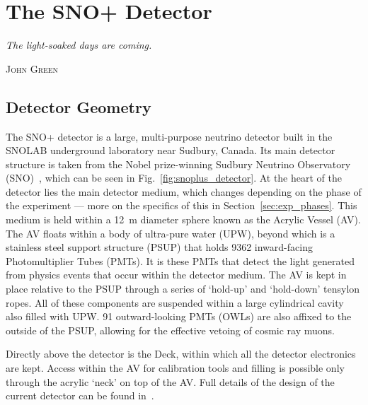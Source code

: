 
\chapter{The SNO+ Detector}\label{chap:detector}
\epigraph{\textit{The light-soaked days are coming.}}{\textsc{John Green}}
\section{Detector Geometry}
The SNO+ detector is a large, multi-purpose neutrino detector built in the SNOLAB underground laboratory near Sudbury, Canada. Its main detector structure is taken from the Nobel prize-winning Sudbury Neutrino Observatory (SNO)~\cite{}, %
which can be seen in Fig.~\ref{fig:snoplus_detector}. At the heart of the detector lies the main detector medium, which changes depending on the phase of the experiment --- more on the specifics of this in Section~\ref{sec:exp_phases}. This medium is held within a \SI{12}{\metre} diameter sphere known as the Acrylic Vessel (AV). The AV floats within a body of ultra-pure water (UPW), beyond which is a stainless steel support structure (PSUP) that holds 9362 inward-facing Photomultiplier Tubes (PMTs). It is these PMTs that detect the light generated from physics events that occur within the detector medium. The AV is kept in place relative to the PSUP through a series of `hold-up' and `hold-down' tensylon ropes. All of these components are suspended within a large cylindrical cavity also filled with UPW. 91 outward-looking PMTs (OWLs) are also affixed to the outside of the PSUP, allowing for the effective vetoing of cosmic ray muons.

Directly above the detector is the Deck, within which all the detector electronics are kept. Access within the AV for calibration tools and filling is possible only through the acrylic `neck' on top of the AV. Full details of the design of the current detector can be found in~\cite{albaneseSNOExperiment2021}.

